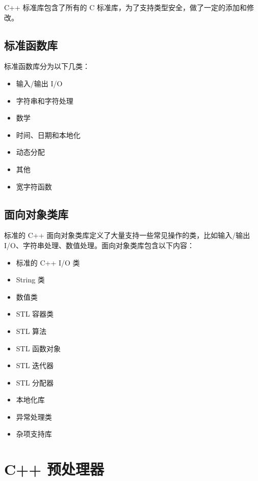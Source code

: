 \documentclass[
]{article}
\providecommand{\tightlist}{%
  \setlength{\itemsep}{0pt}\setlength{\parskip}{0pt}}
\begin{document}
C++ 标准库包含了所有的 C
标准库，为了支持类型安全，做了一定的添加和修改。

\hypertarget{ux6807ux51c6ux51fdux6570ux5e93}{%
\subsection{标准函数库}\label{ux6807ux51c6ux51fdux6570ux5e93}}

标准函数库分为以下几类：

\begin{itemize}
\tightlist
\item
  输入/输出 I/O
\item
  字符串和字符处理
\item
  数学
\item
  时间、日期和本地化
\item
  动态分配
\item
  其他
\item
  宽字符函数
\end{itemize}

\hypertarget{ux9762ux5411ux5bf9ux8c61ux7c7bux5e93}{%
\subsection{面向对象类库}\label{ux9762ux5411ux5bf9ux8c61ux7c7bux5e93}}

标准的 C++ 面向对象类库定义了大量支持一些常见操作的类，比如输入/输出
I/O、字符串处理、数值处理。面向对象类库包含以下内容：

\begin{itemize}
\tightlist
\item
  标准的 C++ I/O 类
\item
  String 类
\item
  数值类
\item
  STL 容器类
\item
  STL 算法
\item
  STL 函数对象
\item
  STL 迭代器
\item
  STL 分配器
\item
  本地化库
\item
  异常处理类
\item
  杂项支持库
\end{itemize}

\hypertarget{c-ux9884ux5904ux7406ux5668}{%
\section{C++ 预处理器}\label{c-ux9884ux5904ux7406ux5668}}
\end{document}
